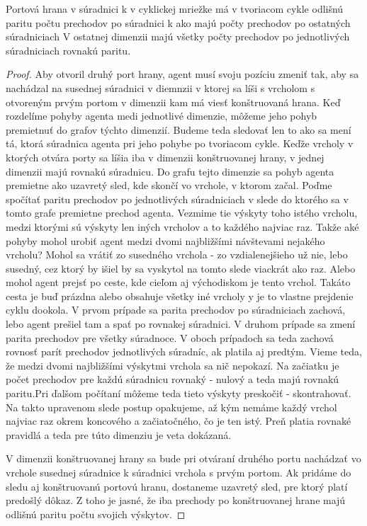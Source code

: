 \begin{lem}
Portová hrana v súradnici k v cyklickej mriežke má v tvoriacom cykle 
odlišnú paritu počtu prechodov po súradnici k ako majú počty prechodov 
po ostatných súradniciach
V ostatnej dimenzii majú všetky počty prechodov po jednotlivých súradniciach
rovnakú paritu.
\end{lem}
\begin{proof}
Aby otvoril druhý port hrany, agent musí svoju pozíciu zmeniť tak, 
aby sa nachádzal na susednej súradnici v diemnzii v ktorej sa líši s
vrcholom s otvoreným prvým portom v dimenzii kam má viesť konštruovaná hrana.
Keď rozdelíme pohyby agenta medi jednotlivé dimenzie, môžeme jeho pohyb
premietnuť do grafov týchto dimenzií. Budeme teda sledovať len to ako sa
mení tá, ktorá súradnica agenta pri jeho pohybe po tvoriacom cykle.
Keďže vrcholy v ktorých otvára porty sa líšia iba v dimenzii konštruovanej
hrany, v jednej dimenzii majú rovnakú súradnicu. Do grafu tejto dimenzie sa
pohyb agenta premietne ako uzavretý sled, kde skončí vo vrchole, v ktorom
začal.
Poďme spočítať paritu prechodov po jednotlivých súradniciach v slede do
ktorého sa v tomto grafe premietne prechod agenta.  Vezmime tie výskyty toho
istého vrcholu, medzi ktorými sú výskyty len iných vrcholov a to každého 
najviac raz. Takže aké pohyby mohol urobiť agent medzi dvomi najbližšími
návštevami nejakého vrcholu? Mohol sa vrátiť zo susedného vrchola - zo
vzdialenejšieho už nie, lebo susedný, cez ktorý by išiel by sa vyskytol na
tomto slede viackrát ako raz. 
Alebo mohol agent prejsť po ceste, kde cieľom
aj východiskom je tento vrchol. Takáto cesta je buď prázdna alebo obsahuje
všetky iné vrcholy y je to vlastne prejdenie cyklu dookola.
V prvom prípade sa parita prechodov po súradniciach zachová, lebo agent
prešiel tam a spať po rovnakej súradnici. V druhom prípade sa zmení parita
prechodov pre všetky súradnoce. V oboch prípadoch sa teda zachová rovnosť
parít prechodov jednotlivých súradníc, ak platila aj predtým. 
Vieme teda, že medzi dvomi najbližšími výskytmi vrchola sa nič nepokazí. Na
začiatku je počet prechodov pre každú súradnicu rovnaký - nulový a teda majú
rovnakú paritu.Pri ďalšom počítaní môžeme teda tieto výskyty preskočiť -
skontrahovať. Na takto upravenom slede postup opakujeme, až kým nemáme každý
vrchol najviac raz okrem koncového a začiatočného, čo je ten istý. Preň
platia rovnaké pravidlá a teda pre túto dimenziu je veta dokázaná.

V dimenzii konštruovanej hrany sa bude pri otváraní druhého portu nachádzať
vo vrchole susednej súradnice k súradnici vrchola s prvým portom.
Ak pridáme do sledu aj konštruovanú portovú hranu, dostaneme uzavretý sled, pre ktorý
platí predošlý dôkaz. Z toho je jasné, že iba prechody po konštruovanej
hrane majú odlišnú paritu počtu svojich výskytov.
\end{proof}



